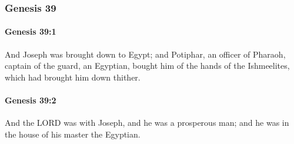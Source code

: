 	\subsubsection{Genesis 39} %
		\label{GENESIS-39}

		\paragraph{Genesis 39:1} %
			\label{GENESIS-39-1}

			And Joseph was brought down to Egypt; and Potiphar, an officer of Pharaoh, captain of the guard, an Egyptian, bought him of the hands of the Ishmeelites, which had brought him down thither.


		\paragraph{Genesis 39:2} %
			\label{GENESIS-39-2}

			And the LORD was with Joseph, and he was a prosperous man; and he was in the house of his master the Egyptian.

